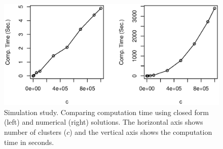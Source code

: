 \documentclass[11pt,a5paper,twoside]{book}
\begin{document}
{\addtolength{\tabcolsep}{-.9mm}

\begin{table}[ht]
\centering
\caption[Simulation study. The computation time]{Simulation study. The computation time for a sample with $n=10$ and $c=$1e+02, 1e+03, 1e+04, 5e+04, 1e+05, 3e+05, 5e+05, 7e+05, 9e+05, 1e+06. The closed form solution is obtained by implementing the results of this paper in R, and the numerical solution is obtained using PROC MIXED in SAS to estimate a repeated measurement model with AR(1) covariance structure.}
\label{comp_time}

\vspace*{2mm}
\end{table}


\addtolength{\tabcolsep}{.9mm}


\begin{figure}[t]
\centering
\includegraphics[scale=1, trim= 0cm 4cm 0cm 4cm]{comp_time.eps}
\caption[Simulation study. Comparing computation time using closed form and numerical solutions]{Simulation study. Comparing computation time using closed form (left) and numerical (right) solutions. The horizontal axis shows number of clusters ($c$) and the vertical axis shows the computation time in seconds.} \label{fig_comp_time}
\end{figure}

\setcounter{equation}{0}
}
\end{document}

